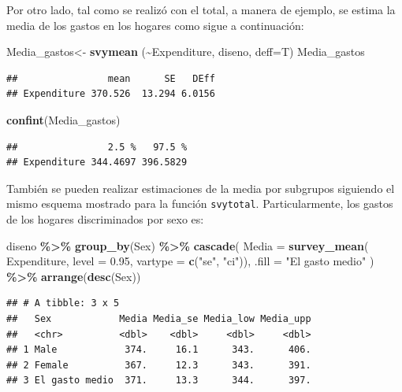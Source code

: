 \documentclass[
  spanish,
  12pt,
]{book}
\newenvironment{Shaded}{\begin{snugshade}}{\end{snugshade}}
\newcommand{\AttributeTok}[1]{\textcolor[rgb]{0.13,0.29,0.53}{#1}}
\newcommand{\FloatTok}[1]{\textcolor[rgb]{0.00,0.00,0.81}{#1}}
\newcommand{\FunctionTok}[1]{\textcolor[rgb]{0.13,0.29,0.53}{\textbf{#1}}}
\newcommand{\NormalTok}[1]{#1}
\newcommand{\OtherTok}[1]{\textcolor[rgb]{0.56,0.35,0.01}{#1}}
\newcommand{\SpecialCharTok}[1]{\textcolor[rgb]{0.81,0.36,0.00}{\textbf{#1}}}
\newcommand{\StringTok}[1]{\textcolor[rgb]{0.31,0.60,0.02}{#1}}
\begin{document}
Por otro lado, tal como se realizó con el total, a manera de ejemplo, se estima la media de los gastos en los hogares como sigue a continuación:

\begin{Shaded}
\begin{Highlighting}[]
\NormalTok{Media\_gastos}\OtherTok{\textless{}{-}} \FunctionTok{svymean}\NormalTok{ (}\SpecialCharTok{\textasciitilde{}}\NormalTok{Expenditure, diseno, }\AttributeTok{deff=}\NormalTok{T)}
\NormalTok{Media\_gastos}
\end{Highlighting}
\end{Shaded}

\begin{verbatim}
##                mean      SE   DEff
## Expenditure 370.526  13.294 6.0156
\end{verbatim}

\begin{Shaded}
\begin{Highlighting}[]
\FunctionTok{confint}\NormalTok{(Media\_gastos)}
\end{Highlighting}
\end{Shaded}

\begin{verbatim}
##                2.5 %   97.5 %
## Expenditure 344.4697 396.5829
\end{verbatim}

También se pueden realizar estimaciones de la media por subgrupos siguiendo el mismo esquema mostrado para la función \texttt{svytotal}. Particularmente, los gastos de los hogares discriminados por sexo es:

\begin{Shaded}
\begin{Highlighting}[]
\NormalTok{diseno }\SpecialCharTok{\%\textgreater{}\%} \FunctionTok{group\_by}\NormalTok{(Sex) }\SpecialCharTok{\%\textgreater{}\%}
  \FunctionTok{cascade}\NormalTok{(}
    \AttributeTok{Media =} \FunctionTok{survey\_mean}\NormalTok{(}
\NormalTok{      Expenditure, }\AttributeTok{level =} \FloatTok{0.95}\NormalTok{,}
       \AttributeTok{vartype =}  \FunctionTok{c}\NormalTok{(}\StringTok{"se"}\NormalTok{, }\StringTok{"ci"}\NormalTok{)),}
        \AttributeTok{.fill =} \StringTok{"El gasto medio"}\NormalTok{  ) }\SpecialCharTok{\%\textgreater{}\%}
  \FunctionTok{arrange}\NormalTok{(}\FunctionTok{desc}\NormalTok{(Sex))}
\end{Highlighting}
\end{Shaded}

\begin{verbatim}
## # A tibble: 3 x 5
##   Sex            Media Media_se Media_low Media_upp
##   <chr>          <dbl>    <dbl>     <dbl>     <dbl>
## 1 Male            374.     16.1      343.      406.
## 2 Female          367.     12.3      343.      391.
## 3 El gasto medio  371.     13.3      344.      397.
\end{verbatim}
\end{document}
